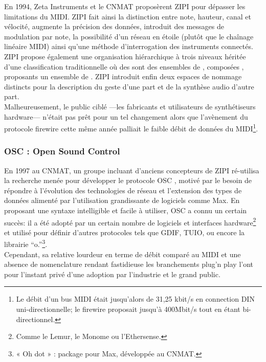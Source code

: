 \noindent En 1994, Zeta Instruments et le \gls{CNMAT} proposèrent \gls{ZIPI}\cite{mcmillen_zipi_1994} pour dépasser les limitations du MIDI. \gls{ZIPI} fait ainsi la distinction entre note, hauteur, canal et vélocité, augmente la précision des données, introduit des messages de modulation par note, la possibilité d'un réseau en étoile (plutôt que le chaînage linéaire \gls{MIDI}) ainsi qu'une méthode d'interrogation des instruments connectés.\\
\indent \gls{ZIPI} propose également une organisation hiérarchique à trois niveaux héritée d'une classification traditionnelle où des  sont des ensembles de , composées , proposants un ensemble de . ZIPI introduit enfin deux espaces de nommage distincts pour la description du geste d'une part et de la synthèse audio d'autre part.\\
Malheureusement, le public ciblé —les fabricants et utilisateurs de synthétiseurs hardware— n'était pas prêt pour un tel changement alors que l'avènement du protocole \gls{firewire} cette même année palliait le faible débit de données du \gls{MIDI}\footnote{ Le débit d'un bus \gls{MIDI} était jusqu'alors de 31,25 kbit/s en connection DIN uni-directionnelle; le \gls{firewire} proposait jusqu'à 400Mbit/s tout en étant bi-directionnel.}.

\subsubsection{OSC : Open Sound Control}

\noindent En 1997 au \gls{CNMAT}, un groupe incluant d'anciens concepteurs de ZIPI ré-utilisa la recherche menée pour développer le protocole \gls{OSC} \cite{wright_open_1997}, motivé par le besoin de répondre à l'évolution des technologies de réseau et l'extension des types de données alimenté par l'utilisation grandissante de logiciels comme Max. En proposant une syntaxe intelligible et facile à utiliser, \gls{OSC} a connu un certain succès: il a été adopté par un certain nombre de logiciels et interfaces hardware\footnote{ Comme le Lemur, le Monome ou l'Ethersense.} et utilisé pour définir d'autres protocoles tels que \gls{GDIF}, \gls{TUIO}, ou encore la librairie ``o.''\footnote{ « Oh dot » : package pour Max, développée au \gls{CNMAT}.}.\\
\indent Cependant, sa relative lourdeur en terme de débit comparé au \gls{MIDI} \cite{fraietta_open_2008} et une absence de nomenclature rendant fastidieuse les branchements plug'n play l'ont pour l'instant privé d'une adoption par l'industrie et le grand public.

